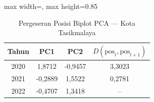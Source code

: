 \begin{table}[H]
\centering
\caption{Pergeseran Posisi Biplot PCA --- Kota Tasikmalaya} \label{tab:samplejarak_pca_skor_kota_tasikmalaya}
\begin{adjustbox}{max width=\textwidth, max height=0.85\textheight}
\begin{tabular}{|c|c|c|c|}
\hline
\textbf{Tahun} & \textbf{PC1} & \textbf{PC2} & \textbf{$D(\text{pos}_t, \text{pos}_{t+1})$} \\
\hline
2020 & 1,8712 & -0,9457 & 3,3023 \\
2021 & -0,2889 & 1,5522 & 0,2781 \\
2022 & -0,4707 & 1,3418 & -- \\
\hline
\end{tabular}
\end{adjustbox}
\end{table}